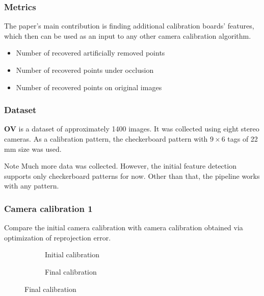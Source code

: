 \documentclass{beamer}
\begin{document}
\begin{frame}
	\frametitle{Metrics}
	The paper's main contribution is finding additional calibration boards' features, which
	then can be used as an input to any other camera calibration algorithm.

	\begin{itemize}
		\item Number of recovered artificially removed points
		\item Number of recovered points under occlusion
		\item Number of recovered points on original images
	\end{itemize}

\end{frame}

\begin{frame}
	\frametitle{Dataset}
	\textbf{OV} \citep{lochmanBabelCalibUniversalApproach2021} is a dataset of
	approximately 1400 images. It was collected using eight stereo cameras.
	As a calibration pattern, the checkerboard pattern with \(9\times 6\) tags of 22 mm size
	was used.

	\begin{alertblock}{Note}
		Much more data was collected. However, the initial feature detection
		supports only checkerboard patterns for now. Other than that, the pipeline
		works with any pattern.
	\end{alertblock}
\end{frame}

\begin{frame}
	\frametitle{Camera calibration 1}
	Compare the initial camera calibration with camera calibration obtained via
	optimization of reprojection error.

	\begin{figure}
		\begin{subfigure}{0.45\linewidth}
			\caption{Initial calibration}
		\end{subfigure}
		\hfill
		\begin{subfigure}{0.45\linewidth}
			\caption{Final calibration}
		\end{subfigure}
	\end{figure}
\end{frame}
\end{document}
